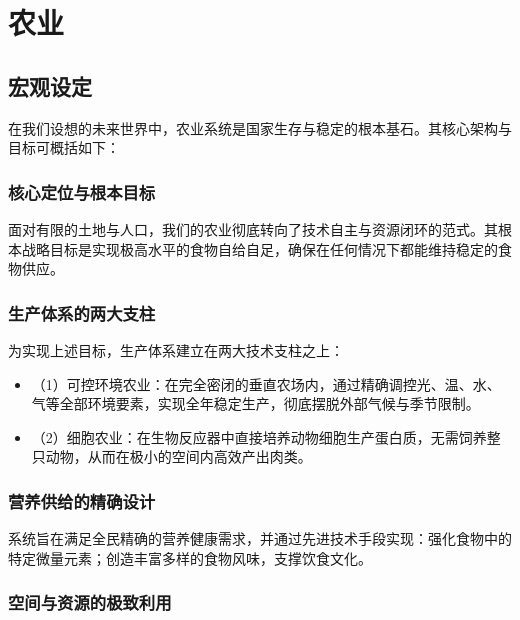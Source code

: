 ﻿\chapter{农业}\label{ux519cux4e1a}

\section{宏观设定}\label{ux5b8fux89c2ux8bbeux5b9a}

在我们设想的未来世界中，农业系统是国家生存与稳定的根本基石。其核心架构与目标可概括如下：

\subsection{核心定位与根本目标}\label{ux6838ux5fc3ux5b9aux4f4dux4e0eux6839ux672cux76eeux6807}

面对有限的土地与人口，我们的农业彻底转向了技术自主与资源闭环的范式。其根本战略目标是实现极高水平的食物自给自足，确保在任何情况下都能维持稳定的食物供应。

\subsection{生产体系的两大支柱}\label{ux751fux4ea7ux4f53ux7cfbux7684ux4e24ux5927ux652fux67f1}

为实现上述目标，生产体系建立在两大技术支柱之上：

\begin{itemize}
\item
  （1）可控环境农业：在完全密闭的垂直农场内，通过精确调控光、温、水、气等全部环境要素，实现全年稳定生产，彻底摆脱外部气候与季节限制。
\item
  （2）细胞农业：在生物反应器中直接培养动物细胞生产蛋白质，无需饲养整只动物，从而在极小的空间内高效产出肉类。
\end{itemize}

\subsection{营养供给的精确设计}\label{ux8425ux517bux4f9bux7ed9ux7684ux7cbeux786eux8bbeux8ba1}

系统旨在满足全民精确的营养健康需求，并通过先进技术手段实现：强化食物中的特定微量元素；创造丰富多样的食物风味，支撑饮食文化。

\subsection{空间与资源的极致利用}\label{ux7a7aux95f4ux4e0eux8d44ux6e90ux7684ux6781ux81f4ux5229ux7528}

